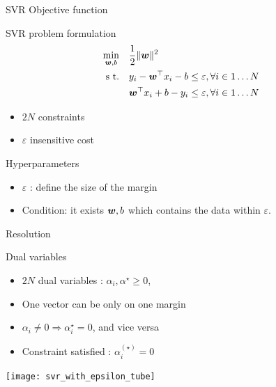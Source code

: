 \documentclass[11pt, pdf, compress, handout]{beamer}
\begin{document}
\begin{frame}{SVR Objective function}
  
  \begin{block}{SVR problem formulation}
    \begin{equation*}
    \begin{aligned}
      \min_{{\boldsymbol{w}},b}\quad  & \frac{1}{2} \| {\boldsymbol{w}} \|^2 \\
      \textrm{s t.}\quad & y_i - {\boldsymbol{w}}^\top x_i - b \leq \varepsilon,
      \forall i \in 1\dots N \\
      &  {\boldsymbol{w}}^\top x_i  + b - y_i \leq \varepsilon,
      \forall i \in 1\dots N                        
    \end{aligned}
  \end{equation*}
  \begin{itemize}
      \item $2 N$ constraints
      \item $\varepsilon$ insensitive cost
    \end{itemize}

  \framebreak
    \begin{block}{Hyperparameters}
      \begin{itemize}
      \item $\varepsilon$ : define the size of the margin
      \item Condition: it exists ${\boldsymbol{w}}, b$ which contains the data
        within $\varepsilon$.
      \end{itemize}
    \end{block}
  \end{block}    
\end{frame}
\begin{frame}{Resolution}
  \begin{block}{Dual variables}
    \begin{itemize}
    \item $2N$ dual variables : $\alpha_i, \alpha^\star \geq 0$, 
    \item One vector can be only on one margin 
    \item $\alpha_i \neq 0 \Rightarrow \alpha_i^\star = 0$, and vice
      versa
    \item Constraint satisfied : $\alpha_i^{(\star)} = 0$
    \end{itemize}
  \end{block}
  \begin{center}
    \texttt{[image: svr\_with\_epsilon\_tube]}
  \end{center}

  
\end{frame}
\end{document}
